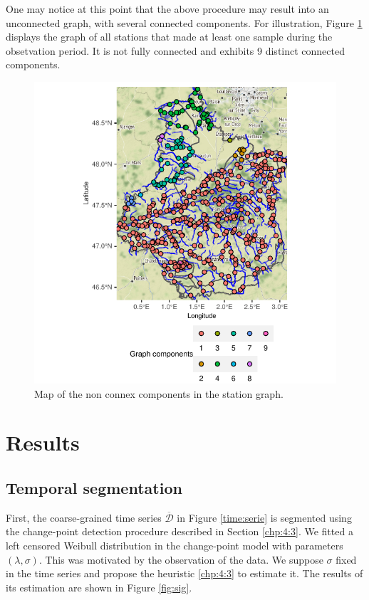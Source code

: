 One may notice at this point that the above procedure may result into an unconnected graph, with several connected components. For illustration, Figure \ref{fig:comp} displays the graph of all stations that made at least one sample during the obsetvation period. It is not fully connected and exhibits 9 distinct connected components.  

\begin{figure}[ht]
  \centering
  \includegraphics[]{figs/Chap5/Graph_comp-1.pdf}
  \caption{Map of the non connex components in the station graph.}
  \label{fig:comp}
\end{figure}

\section{Results}\label{section:results}

\subsection{Temporal segmentation}\label{sec:time_pattern}

First, the coarse-grained time series $\overline{\mathcal{D}}$ in Figure \ref{time:serie} is segmented using the change-point detection procedure described in Section \ref{chp:4:3}. We fitted a left censored Weibull distribution in the change-point model with parameters $(\lambda,\sigma)$. This was motivated by the observation of the data. We suppose $\sigma$ fixed in the time series and propose the heuristic \ref{chp:4:3} to estimate it. The results of its estimation are shown in Figure \ref{fig:sig}.


